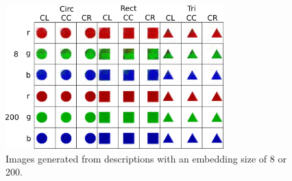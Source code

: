\begin{figure}
\centering
\includegraphics[width=0.75\textwidth]{Figs/shapes/331_8v200.png}
\caption{Images generated from descriptions with an embedding size of 8 or 200.}
\label{fig:8vs200}
\end{figure}


